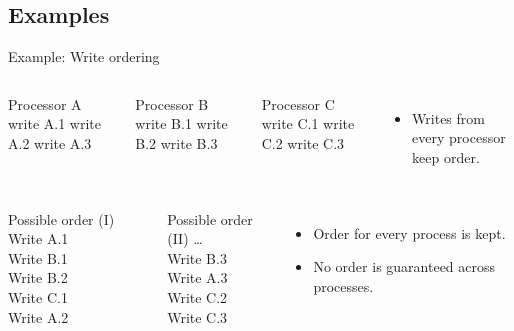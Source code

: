 \subsection{Examples}

\begin{frame}[t]{Example: Write ordering}
\begin{columns}[T]

\begin{block}{\small Processor A}
write A.1
write A.2
write A.3
\end{block}

\begin{block}{\small Processor B}
write B.1
write B.2
write B.3
\end{block}

\begin{block}{\small Processor C}
write C.1
write C.2
write C.3
\end{block}

\begin{itemize}
  \item Writes from every processor keep order.
\end{itemize}

\end{columns}


\begin{columns}[T]


{\small
\begin{block}{Possible order (I)}
Write A.1\\
Write B.1\\
Write B.2\\
Write C.1\\
Write A.2\\
\end{block}
}

{\small
\begin{block}{Possible order (II)}
\ldots\\
Write B.3\\
Write A.3\\
Write C.2\\
Write C.3\\
\end{block}
}


\begin{itemize}
  \item Order for every process is kept.
  \item No order is guaranteed across processes.
\end{itemize}
\end{columns}

\end{frame}

